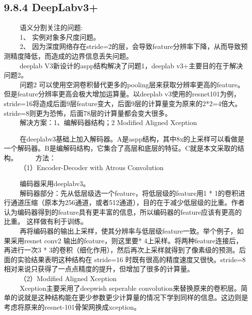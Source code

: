 \subsection{9.8.4 DeepLabv3+}\label{deeplabv3-1}

   语义分割关注的问题:\\
   1、 实例对象多尺度问题。\\
   2、
因为深度网络存在stride=2的层，会导致feature分辨率下降，从而导致预测精度降低，而造成的边界信息丢失问题。\\
   deeplab V3新设计的aspp结构解决了问题1，deeplab
v3+主要目的在于解决问题2。\\
   问题2
可以使用空洞卷积替代更多的pooling层来获取分辨率更高的feature。但是feature分辨率更高会极大增加运算量。以deeplab
v3使用的resnet101为例，stride=16将造成后面9层feature变大，后面9层的计算量变为原来的2*2=4倍大。stride=8则更为恐怖，后面78层的计算量都会变大很多。\\
   解决方案：1、编解码器结构；2 Modified Aligned Xception

\begin{figure}
\centering
\end{figure}

  
在deeplabv3基础上加入解码器。A是aspp结构，其中8x的上采样可以看做是一个解码器。B是编解码结构，它集合了高层和底层的特征。C就是本文采取的结构。
   方法：\\
   （1）Encoder-Decoder with Atrous Convolution

\begin{figure}
\centering
\end{figure}

   编码器采用deeplabv3。\\
   解码器部分：先从低层级选一个feature，将低层级的feature用1 *
1的卷积进行通道压缩（原本为256通道，或者512通道），目的在于减少低层级的比重。作者认为编码器得到的feature具有更丰富的信息，所以编码器的feature应该有更高的比重。
这样做有利于训练。\\
  
再将编码器的输出上采样，使其分辨率与低层级feature一致。举个例子，如果采用resnet
conv2 输出的feature，则这里要* 4上采样。将两种feature连接后，再进行一次3
*
3的卷积（细化作用），然后再次上采样就得到了像素级的预测。后面的实验结果表明这种结构在
stride=16
时既有很高的精度速度又很快。stride=8相对来说只获得了一点点精度的提升，但增加了很多的计算量。\\
   （2）Modified Aligned Xception\\
   Xception主要采用了deepwish seperable
convolution来替换原来的卷积层。简单的说就是这种结构能在更少参数更少计算量的情况下学到同样的信息。这边则是考虑将原来的resnet-101骨架网换成xception。

